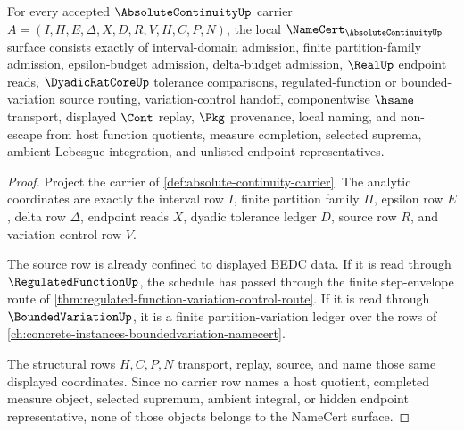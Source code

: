\begin{theorem}
\label{thm:absolute-continuity-namecert-obligations}
For every accepted $\AbsoluteContinuityUp$ carrier $A=(I,\Pi,E,\Delta,X,D,R,V,H,C,P,N)$, the local $\NameCert_{\AbsoluteContinuityUp}$ surface consists exactly of interval-domain admission, finite partition-family admission, epsilon-budget admission, delta-budget admission, $\RealUp$ endpoint reads, $\DyadicRatCoreUp$ tolerance comparisons, regulated-function or bounded-variation source routing, variation-control handoff, componentwise $\hsame$ transport, displayed $\Cont$ replay, $\Pkg$ provenance, local naming, and non-escape from host function quotients, measure completion, selected suprema, ambient Lebesgue integration, and unlisted endpoint representatives.
\end{theorem}
\begin{proof}
Project the carrier of \autoref{def:absolute-continuity-carrier}. The analytic coordinates are exactly the interval row $I$, finite partition family $\Pi$, epsilon row $E$, delta row $\Delta$, endpoint reads $X$, dyadic tolerance ledger $D$, source row $R$, and variation-control row $V$.

The source row is already confined to displayed BEDC data. If it is read through $\RegulatedFunctionUp$, the schedule has passed through the finite step-envelope route of \autoref{thm:regulated-function-variation-control-route}. If it is read through $\BoundedVariationUp$, it is a finite partition-variation ledger over the rows of \autoref{ch:concrete-instances-boundedvariation-namecert}.

The structural rows $H,C,P,N$ transport, replay, source, and name those same displayed coordinates. Since no carrier row names a host quotient, completed measure object, selected supremum, ambient integral, or hidden endpoint representative, none of those objects belongs to the NameCert surface.
\end{proof}

